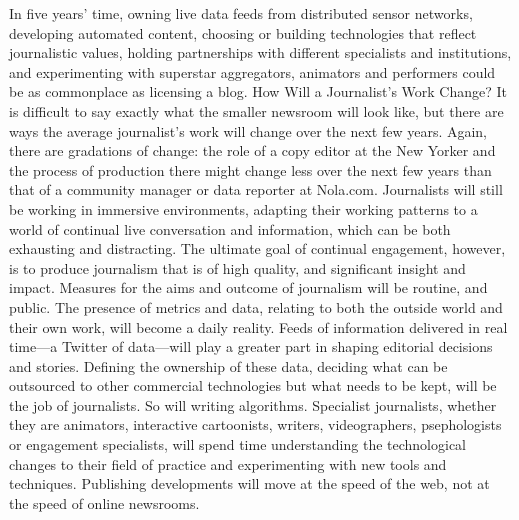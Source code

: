 In five years’ time, owning live data feeds from distributed sensor networks,
developing automated content, choosing or building technologies that reflect
journalistic values, holding partnerships with different specialists and institutions,
and experimenting with superstar aggregators, animators and performers could
be as commonplace as licensing a blog.
How Will a Journalist’s Work Change?
It is difficult to say exactly what the smaller newsroom will look like, but there
are ways the average journalist’s work will change over the next few years. Again,
there are gradations of change: the role of a copy editor at the New Yorker and
the process of production there might change less over the next few years than
that of a community manager or data reporter at Nola.com.
Journalists will still be working in immersive environments, adapting their working
patterns to a world of continual live conversation and information, which can
be both exhausting and distracting. The ultimate goal of continual engagement,
however, is to produce journalism that is of high quality, and significant insight
and impact. Measures for the aims and outcome of journalism will be routine,
and public.
The presence of metrics and data, relating to both the outside world and their
own work, will become a daily reality. Feeds of information delivered in real
time—a Twitter of data—will play a greater part in shaping editorial decisions
and stories. Defining the ownership of these data, deciding what can be outsourced
to other commercial technologies but what needs to be kept, will be the
job of journalists. So will writing algorithms.
Specialist journalists, whether they are animators, interactive cartoonists, writers,
videographers, psephologists or engagement specialists, will spend time understanding
the technological changes to their field of practice and experimenting
with new tools and techniques. Publishing developments will move at the speed
of the web, not at the speed of online newsrooms.

